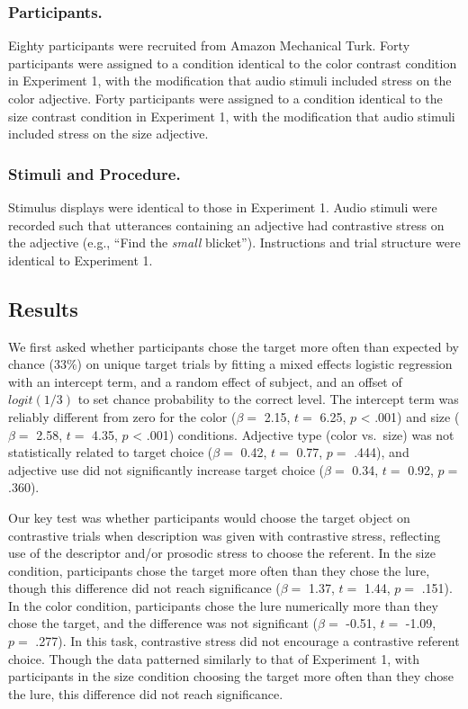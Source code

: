 \documentclass[10pt, letterpaper]{article}
\begin{document}
\subsubsection{Participants.}\label{participants.-2}

Eighty participants were recruited from Amazon Mechanical Turk. Forty
participants were assigned to a condition identical to the color
contrast condition in Experiment 1, with the modification that audio
stimuli included stress on the color adjective. Forty participants were
assigned to a condition identical to the size contrast condition in
Experiment 1, with the modification that audio stimuli included stress
on the size adjective.

\subsubsection{Stimuli and Procedure.}\label{stimuli-and-procedure.}

Stimulus displays were identical to those in Experiment 1. Audio stimuli
were recorded such that utterances containing an adjective had
contrastive stress on the adjective (e.g., ``Find the \emph{small}
blicket''). Instructions and trial structure were identical to
Experiment 1.

\subsection{Results}\label{results-2}

We first asked whether participants chose the target more often than
expected by chance (\(33\%\)) on unique target trials by fitting a mixed
effects logistic regression with an intercept term, and a random effect
of subject, and an offset of \(logit(1/3)\) to set chance probability to
the correct level. The intercept term was reliably different from zero
for the color (\(\beta =\) 2.15, \(t =\) 6.25, \(p\) \textless{} .001)
and size (\(\beta =\) 2.58, \(t =\) 4.35, \(p\) \textless{} .001)
conditions. Adjective type (color vs.~size) was not statistically
related to target choice (\(\beta =\) 0.42, \(t =\) 0.77, \(p =\) .444),
and adjective use did not significantly increase target choice
(\(\beta =\) 0.34, \(t =\) 0.92, \(p =\) .360).

Our key test was whether participants would choose the target object on
contrastive trials when description was given with contrastive stress,
reflecting use of the descriptor and/or prosodic stress to choose the
referent. In the size condition, participants chose the target more
often than they chose the lure, though this difference did not reach
significance (\(\beta =\) 1.37, \(t =\) 1.44, \(p =\) .151). In the
color condition, participants chose the lure numerically more than they
chose the target, and the difference was not significant (\(\beta =\)
-0.51, \(t =\) -1.09, \(p =\) .277). In this task, contrastive stress
did not encourage a contrastive referent choice. Though the data
patterned similarly to that of Experiment 1, with participants in the
size condition choosing the target more often than they chose the lure,
this difference did not reach significance.
\end{document}
